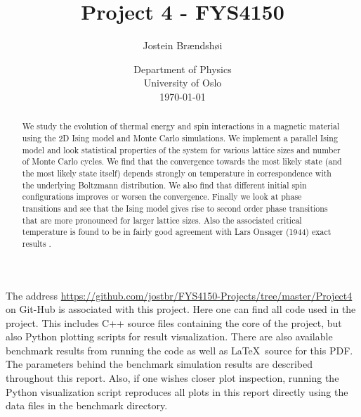 \documentclass[12pt]{article}
\numberwithin{figure}{section}
\numberwithin{table}{section}
\begin{document}
\begin{titlepage}
\title{Project 4 - FYS4150}
\author{Jostein Brændshøi}
\date{
    Department of Physics\\%
    University of Oslo\\[2ex]%
    \today
}
\clearpage
\maketitle
\thispagestyle{empty}

\begin{abstract}
\noindent We study the evolution of thermal energy and spin interactions in a magnetic material using the 2D Ising model and Monte Carlo simulations. We implement a parallel Ising model and look statistical properties of the system for various lattice sizes and number of Monte Carlo cycles. We find that the convergence towards the most likely state (and the most likely state itself) depends strongly on temperature in correspondence with the underlying Boltzmann distribution. We also find that different initial spin configurations improves or worsen the convergence. Finally we look at phase transitions and see that the Ising model gives rise to second order phase transitions that are more pronounced for larger lattice sizes. Also the associated critical temperature is found to be in fairly good agreement with Lars Onsager (1944) exact results \cite{LarsOnsager}.
\end{abstract}
\vspace{2.00cm}

\noindent The address \url{https://github.com/jostbr/FYS4150-Projects/tree/master/Project4} on Git-Hub is associated with this project. Here one can find all code used in the project. This includes C++ source files containing the core of the project, but also Python plotting scripts for result visualization. There are also available benchmark results from running the code as well as \LaTeX \ source for this PDF. The parameters behind the benchmark simulation results are described throughout this report. Also, if one wishes closer plot inspection, running the Python visualization script reproduces all plots in this report directly using the data files in the benchmark directory.

\end{titlepage}
\pagebreak


\end{document}
